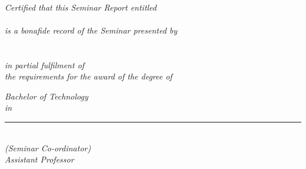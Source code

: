 \clearpage
\thispagestyle{empty}

\begin{center}

\Large \textbf{\myCollegeName{}}\par
\large \textbf{\myDeptName{}}\\[1.0cm]

\emph{Certified that this Seminar Report entitled}\\[0.5cm]

\Huge \textbf{\myTopic{}}\\[1.5cm]

\large \emph{is a bonafide record of the Seminar presented by}\\[1cm]

\normalsize \textbf{\myName{}\\
	\myRollNo{}}\\[3.5cm]

\large \emph{in partial fulfilment of\\
	the requirements for the award of the degree of}

\Large \emph{Bachelor of Technology}\\
\small \emph{in}\par
\large \emph{\myBranchName{}}

\vfill
\hrule
\vspace{2.0cm}

{\onehalfspacing
\large \textbf{\mySeminarCoordinator{}}\\

\small
\emph{
	(Seminar Co-ordinator)\\
	Assistant Professor\\
	\myDeptName{}}}

\end{center}
